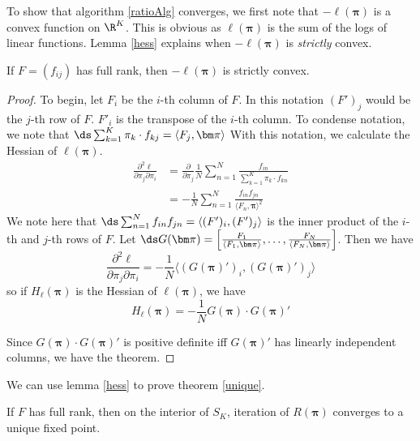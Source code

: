 To show that algorithm \ref{ratioAlg} converges, we first note that $-\ell(\bm\pi)$ is a convex function on $\R^K$.  This is obvious as $\ell(\bm\pi)$ is the sum of the logs of linear functions. Lemma \ref{hess} explains when $-\ell(\bm\pi)$ is \textit{strictly} convex.

\begin{lemm}\label{hess}
If $F=(f_{ij})$ has full rank, then $-\ell(\bm\pi)$ is strictly convex.
\end{lemm}		

\begin{proof}
To begin, let $F_i$ be the $i$-th column of $F$.  In this notation $(F')_j$ would be the $j$-th row of $F$. $F'_i$ is the transpose of the $i$-th column.  To condense notation, we note that \(\ds \sum_{k=1}^{K}\pi_k\cdot f_{kj}=\langle F_j,\bm\pi\rangle\)
With this notation, we calculate the Hessian of $\ell(\bm\pi)$.
\begin{align*}
\frac{\partial^2\ell}{\partial\pi_j\partial\pi_i}&=\frac{\partial}{\partial\pi_j}\frac 1N\sum_{n=1}^{N}\frac{f_{in}}{\sum_{k=1}^{K}\pi_k\cdot f_{kn}}\\
&=-\frac 1N\sum_{n=1}^{N}\frac{f_{in} f_{jn}}{\langle F_n,\bm\pi\rangle^2}
\end{align*}
We note here that \(\ds \sum_{n=1}^{N}f_{in}f_{jn} =\langle (F')_i,(F')_j\rangle\) is the inner product of the $i$-th and $j$-th rows of $F$. Let $\ds G(\bm\pi)=\left[\frac{F_1}{\langle F_1,\bm\pi\rangle},\ldots,\frac{F_N}{\langle F_N,\bm\pi\rangle}\right] $. Then we have
\[\frac{\partial^2\ell}{\partial\pi_j\partial\pi_i}=-\frac 1N \langle(G(\bm\pi)')_i,(G(\bm\pi)')_j\rangle\]
so if $H_{\ell}(\bm\pi)$ is the Hessian of $\ell(\bm\pi)$, we have
\begin{equation}\label{hessDef}
H_{\ell}(\bm\pi)=-\frac 1N G(\bm\pi)\cdot G(\bm\pi)'
\end{equation}

Since $G(\bm\pi)\cdot G(\bm\pi)'$ is positive definite iff $G(\bm\pi)'$ has linearly independent columns, we have the theorem.
\end{proof}

We can use lemma \ref{hess} to prove theorem \ref{unique}.
\begin{thm}\label{unique}
If $F$ has full rank, then on the interior of $S_K$, iteration of $R(\bm\pi)$ converges to a unique fixed point.
\end{thm}

